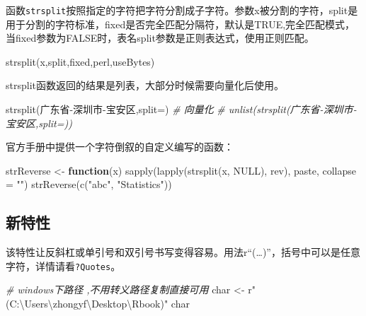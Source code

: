 \documentclass[
]{book}
\newenvironment{Shaded}{\begin{snugshade}}{\end{snugshade}}
\newcommand{\AttributeTok}[1]{\textcolor[rgb]{0.77,0.63,0.00}{#1}}
\newcommand{\CommentTok}[1]{\textcolor[rgb]{0.56,0.35,0.01}{\textit{#1}}}
\newcommand{\ConstantTok}[1]{\textcolor[rgb]{0.00,0.00,0.00}{#1}}
\newcommand{\ControlFlowTok}[1]{\textcolor[rgb]{0.13,0.29,0.53}{\textbf{#1}}}
\newcommand{\FunctionTok}[1]{\textcolor[rgb]{0.00,0.00,0.00}{#1}}
\newcommand{\NormalTok}[1]{#1}
\newcommand{\OtherTok}[1]{\textcolor[rgb]{0.56,0.35,0.01}{#1}}
\newcommand{\StringTok}[1]{\textcolor[rgb]{0.31,0.60,0.02}{#1}}
\begin{document}
函数\texttt{strsplit}按照指定的字符把字符分割成子字符。参数x被分割的字符，split是用于分割的字符标准，fixed是否完全匹配分隔符，默认是TRUE,完全匹配模式，当fixed参数为FALSE时，表名split参数是正则表达式，使用正则匹配。

\begin{Shaded}
\begin{Highlighting}[]
\FunctionTok{strsplit}\NormalTok{(x,split,fixed,perl,useBytes)}
\end{Highlighting}
\end{Shaded}

strsplit函数返回的结果是列表，大部分时候需要向量化后使用。

\begin{Shaded}
\begin{Highlighting}[]
\FunctionTok{strsplit}\NormalTok{(}\StringTok{\textquotesingle{}广东省{-}深圳市{-}宝安区\textquotesingle{}}\NormalTok{,}\AttributeTok{split=}\StringTok{\textquotesingle{}{-}\textquotesingle{}}\NormalTok{)}
\CommentTok{\# 向量化}
\CommentTok{\# unlist(strsplit(\textquotesingle{}广东省{-}深圳市{-}宝安区\textquotesingle{},split=\textquotesingle{}{-}\textquotesingle{}))}
\end{Highlighting}
\end{Shaded}

官方手册中提供一个字符倒叙的自定义编写的函数：

\begin{Shaded}
\begin{Highlighting}[]
\NormalTok{strReverse }\OtherTok{\textless{}{-}} \ControlFlowTok{function}\NormalTok{(x) }\FunctionTok{sapply}\NormalTok{(}\FunctionTok{lapply}\NormalTok{(}\FunctionTok{strsplit}\NormalTok{(x, }\ConstantTok{NULL}\NormalTok{), rev), paste, }\AttributeTok{collapse =} \StringTok{""}\NormalTok{)}
\FunctionTok{strReverse}\NormalTok{(}\FunctionTok{c}\NormalTok{(}\StringTok{"abc"}\NormalTok{, }\StringTok{"Statistics"}\NormalTok{))}
\end{Highlighting}
\end{Shaded}

\hypertarget{ux65b0ux7279ux6027}{%
\subsection{新特性}\label{ux65b0ux7279ux6027}}

该特性让反斜杠或单引号和双引号书写变得容易。用法r``(\ldots)''，括号中可以是任意字符，详情请看\texttt{?Quotes}。

\begin{Shaded}
\begin{Highlighting}[]
\CommentTok{\# windows下路径 ,不用转义路径复制直接可用}
\NormalTok{char }\OtherTok{\textless{}{-}}\NormalTok{ r}\StringTok{"(C:\textbackslash{}Users\textbackslash{}zhongyf\textbackslash{}Desktop\textbackslash{}Rbook)"} 
\NormalTok{char}
\end{Highlighting}
\end{Shaded}
\end{document}
